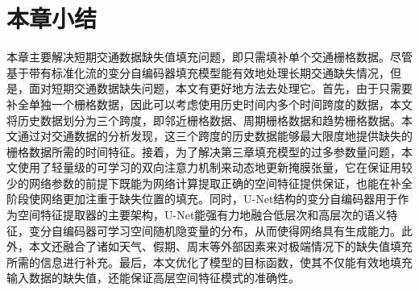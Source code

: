 \section{本章小结} \label{sec4_8}
本章主要解决短期交通数据缺失值填充问题，即只需填补单个交通栅格数据。尽管基于带有标准化流的变分自编码器填充模型能有效地处理长期交通缺失情况，但是，面对短期交通数据缺失问题，本文有更好地方法去处理它。首先，由于只需要补全单独一个栅格数据，因此可以考虑使用历史时间内多个时间跨度的数据，本文将历史数据划分为三个跨度，即邻近栅格数据、周期栅格数据和趋势栅格数据。本文通过对交通数据的分析发现，这三个跨度的历史数据能够最大限度地提供缺失的栅格数据所需的时间特征。接着，为了解决第三章填充模型的过多参数量问题，本文使用了轻量级的可学习的双向注意力机制来动态地更新掩膜张量，它在保证用较少的网络参数的前提下既能为网络计算提取正确的空间特征提供保证，也能在补全阶段使网络更加注重于缺失位置的填充。同时，U-Net结构的变分自编码器用于作为空间特征提取器的主要架构，U-Net能强有力地融合低层次和高层次的语义特征，变分自编码器可学习空间随机隐变量的分布，从而使得网络具有生成能力。此外，本文还融合了诸如天气、假期、周末等外部因素来对极端情况下的缺失值填充所需的信息进行补充。最后，本文优化了模型的目标函数，使其不仅能有效地填充输入数据的缺失值，还能保证高层空间特征模式的准确性。



